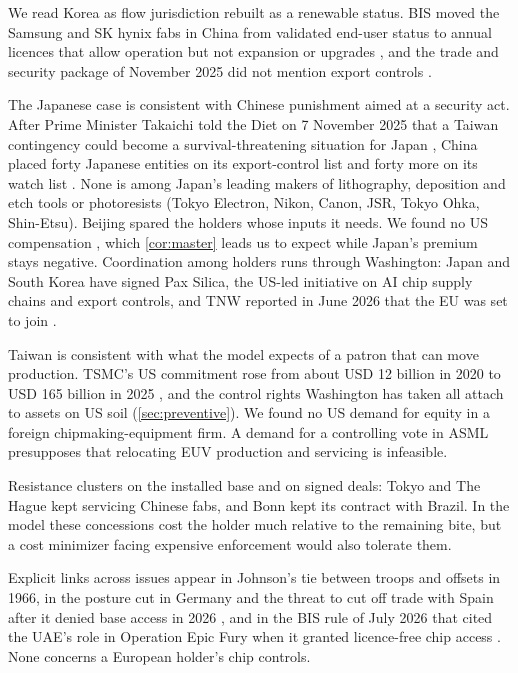 We read Korea as flow jurisdiction rebuilt as a renewable status. BIS moved the Samsung and SK hynix fabs in China from validated end-user status to annual licences that allow operation but not expansion or upgrades \citep{afs2025veu, skhynix2026prospectus, reuters2025koreanlicence}, and the trade and security package of November 2025 did not mention export controls \citep{whitehouse2025korea}.

The Japanese case is consistent with Chinese punishment aimed at a security act. After Prime Minister Takaichi told the Diet on 7 November 2025 that a Taiwan contingency could become a survival-threatening situation for Japan \citep{kokkai2025takaichi}, China placed forty Japanese entities on its export-control list and forty more on its watch list \citep{mofcom2026japan11, mofcom2026japan27}. None is among Japan's leading makers of lithography, deposition and etch tools or photoresists (Tokyo Electron, Nikon, Canon, JSR, Tokyo Ohka, Shin-Etsu). Beijing spared the holders whose inputs it needs. We found no US compensation \citep{teer2026dismantling}, which \cref{cor:master} leads us to expect while Japan's premium stays negative. Coordination among holders runs through Washington: Japan and South Korea have signed Pax Silica, the US-led initiative on AI chip supply chains and export controls, and TNW reported in June 2026 that the EU was set to join \citep{tnw2026paxsilica}.

Taiwan is consistent with what the model expects of a patron that can move production. TSMC's US commitment rose from about USD 12 billion in 2020 to USD 165 billion in 2025 \citep{tsmc2020arizona, tsmc2025expand}, and the control rights Washington has taken all attach to assets on US soil (\cref{sec:preventive}). We found no US demand for equity in a foreign chipmaking-equipment firm. A demand for a controlling vote in ASML presupposes that relocating EUV production and servicing is infeasible.

Resistance clusters on the installed base and on signed deals: Tokyo and The Hague kept servicing Chinese fabs, and Bonn kept its contract with Brazil. In the model these concessions cost the holder much relative to the remaining bite, but a cost minimizer facing expensive enforcement would also tolerate them.

Explicit links across issues appear in Johnson's tie between troops and offsets in 1966, in the posture cut in Germany and the threat to cut off trade with Spain after it denied base access in 2026 \citep{martinez2026germany, roque2026spain, omullony2026ankara}, and in the BIS rule of July 2026 that cited the UAE's role in Operation Epic Fury when it granted licence-free chip access \citep{bis2026uae}. None concerns a European holder's chip controls.

